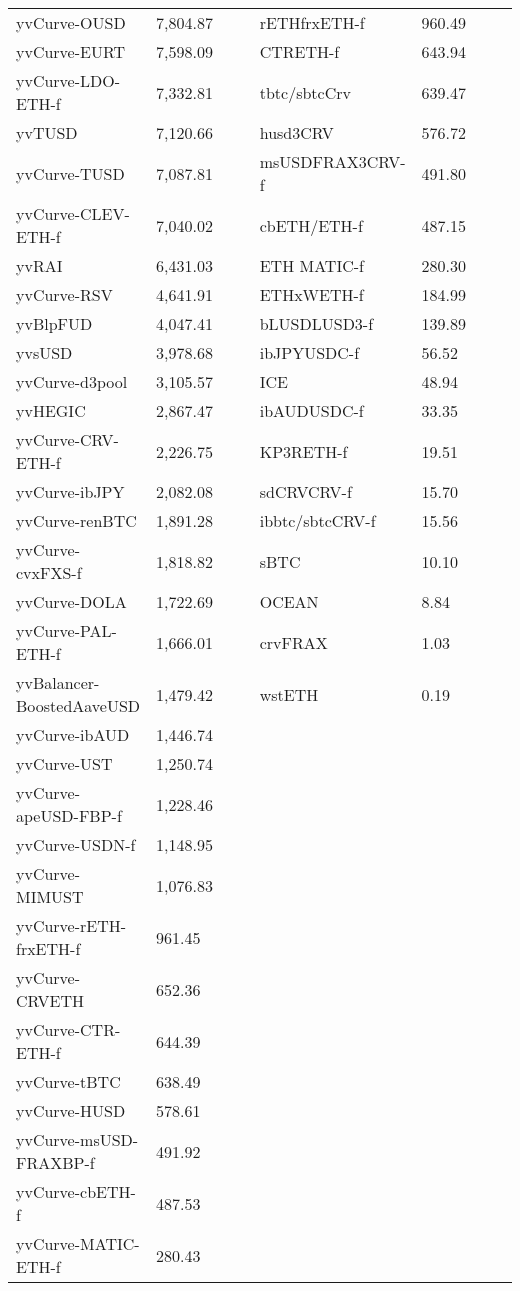 \begin{longtable}{@{}p{0.25\linewidth}p{0.25\linewidth}p{0.25\linewidth}p{0.25\linewidth}@{}}
yvCurve-OUSD & 7,804.87 & rETHfrxETH-f &960.49 \\
yvCurve-EURT & 7,598.09 & CTRETH-f &643.94 \\
yvCurve-LDO-ETH-f & 7,332.81 & tbtc/sbtcCrv &639.47 \\
yvTUSD & 7,120.66 & husd3CRV &576.72 \\
yvCurve-TUSD & 7,087.81 & msUSDFRAX3CRV-f &491.80 \\
yvCurve-CLEV-ETH-f & 7,040.02 & cbETH/ETH-f &487.15 \\
yvRAI & 6,431.03 & ETH MATIC-f &280.30 \\
yvCurve-RSV & 4,641.91 & ETHxWETH-f &184.99 \\
yvBlpFUD & 4,047.41 & bLUSDLUSD3-f &139.89 \\
yvsUSD & 3,978.68 & ibJPYUSDC-f &56.52 \\
yvCurve-d3pool & 3,105.57 & ICE &48.94 \\
yvHEGIC & 2,867.47 & ibAUDUSDC-f &33.35 \\
yvCurve-CRV-ETH-f & 2,226.75 & KP3RETH-f &19.51 \\
yvCurve-ibJPY & 2,082.08 & sdCRVCRV-f &15.70 \\
yvCurve-renBTC & 1,891.28 & ibbtc/sbtcCRV-f &15.56 \\
yvCurve-cvxFXS-f & 1,818.82 & sBTC &10.10 \\
yvCurve-DOLA & 1,722.69 & OCEAN &8.84 \\
yvCurve-PAL-ETH-f & 1,666.01 & crvFRAX &1.03 \\
yvBalancer-BoostedAaveUSD & 1,479.42 & wstETH &0.19 \\
yvCurve-ibAUD & 1,446.74 & & \\
yvCurve-UST & 1,250.74 & & \\
yvCurve-apeUSD-FBP-f & 1,228.46 & & \\
yvCurve-USDN-f & 1,148.95 & & \\
yvCurve-MIMUST & 1,076.83 & & \\
yvCurve-rETH-frxETH-f & 961.45 & & \\
yvCurve-CRVETH & 652.36 & & \\
yvCurve-CTR-ETH-f & 644.39 & & \\
yvCurve-tBTC & 638.49 & & \\
yvCurve-HUSD & 578.61 & & \\
yvCurve-msUSD-FRAXBP-f & 491.92 & & \\
yvCurve-cbETH-f & 487.53 & & \\
yvCurve-MATIC-ETH-f & 280.43 & & \\

\end{longtable}
